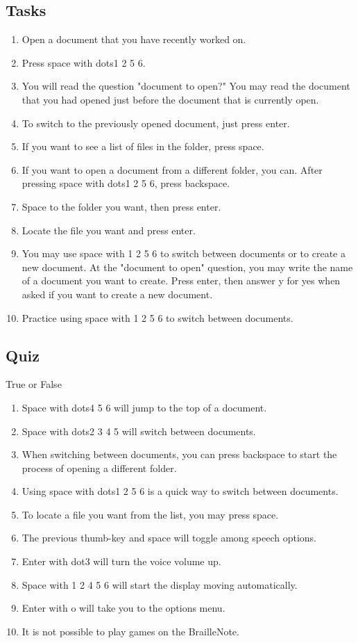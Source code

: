 \documentclass[10pt,letterpaper,twoside]{report}
\begin{document}
{{{ \subsection{Tasks}
\begin{enumerate}
	\item Open a document that you have recently worked on.
	\item Press space with dots1 2 5 6.
	\item You will read the question "document to open?" You may read the document that you had opened just before the document that is currently open.
	\item To switch to the previously opened document, just press enter.
	\item If you want to see a list of files in the folder, press space.
	\item If you want to open a document from a different folder, you can.  After pressing space with dots1 2 5 6, press backspace.
	\item Space to the folder you want, then press enter.
	\item Locate the file you want and press enter.
	\item You may use space with 1 2 5 6 to switch between documents or to create a new document.  At the "document to open" question, you may write the name of a document you want to create.  Press enter, then answer y for yes when asked if you want to create a new document.
	\item Practice using space with 1 2 5 6 to switch between documents.
\end{enumerate}

\clearpage

\subsection{Quiz}
True or False

\begin{enumerate}
	\item Space with dots4 5 6 will jump to the top of a document.
	\item Space with dots2 3 4 5 will switch between documents.
	\item When switching between documents, you can press backspace to start the process of opening a different folder.
	\item Using space with dots1 2 5 6 is a quick way to switch between documents.
	\item To locate a file you want from the list, you may press space.
	\item The previous thumb-key and space will toggle among speech options.
	\item Enter with dot3 will turn the voice volume up.
	\item Space with 1 2 4 5 6 will start the display moving automatically.
	\item Enter with o will take you to the options menu.
	\item It is not possible to play games on the BrailleNote.
\end{enumerate}

}}}
\end{document}
